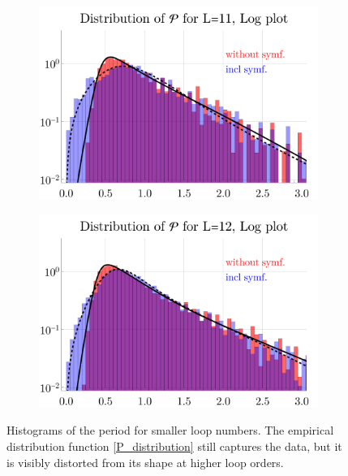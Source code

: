 \documentclass[11pt,a4paper]{article}
\renewcommand{\|}{\rule[-0.4ex]{0.2ex}{1.2em}}
\begin{document}
\begin{figure}[htbp]
	\centering
	\begin{subfigure}[b]{.48 \textwidth}
		\includegraphics[width=\linewidth]{distribution_P_11_log}
		\subcaption{}
	\end{subfigure}
	\begin{subfigure}[b]{.48 \textwidth}
		\includegraphics[width=\linewidth]{distribution_P_12_log}
		\subcaption{}
	\end{subfigure}
	
	\caption{Histograms of the   period for smaller loop numbers. The empirical distribution function \cref{P_distribution} still captures the data, but it is visibly distorted from its shape at higher loop orders. }
	\label{fig:histograms_log_small}
\end{figure}
\end{document}
